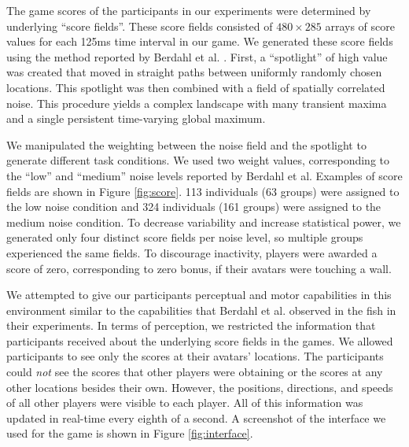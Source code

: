 \documentclass[12pt,letterpaper]{article}
\begin{document}
The game scores of the participants in our experiments were determined
by underlying ``score fields''.  These score fields consisted of $480
\times 285$ arrays of score values for each 125ms time interval in our
game.  We generated these score fields using the method reported by
Berdahl et al. \citeyear{berdahl_emergent_2013}. First, a
``spotlight'' of high value was created that moved in straight paths
between uniformly randomly chosen locations.  This spotlight was then
combined with a field of spatially correlated noise.  This procedure
yields a complex landscape with many transient maxima and a single
persistent time-varying global maximum.

We manipulated the weighting between the noise field and the spotlight
to generate different task conditions.  We used two weight values,
corresponding to the ``low'' and ``medium'' noise levels reported by
Berdahl et al.  Examples of score fields are shown in Figure
\ref{fig:score}.  113 individuals (63 groups) were assigned to the low
noise condition and 324 individuals (161 groups) were assigned to the
medium noise condition.  To decrease variability and increase
statistical power, we generated only four distinct score fields per
noise level, so multiple groups experienced the same fields.  To
discourage inactivity, players were awarded a score of zero,
corresponding to zero bonus, if their avatars were touching a wall.

We attempted to give our participants perceptual and motor capabilities
in this environment similar to the capabilities that Berdahl et
al. observed in the fish in their experiments.  In terms of
perception, we restricted the information that participants received
about the underlying score fields in the games.  We allowed
participants to see only the scores at their avatars' locations.  The
participants could \emph{not} see the scores that other players were
obtaining or the scores at any other locations besides their own.
However, the positions, directions, and speeds of all other players
were visible to each player.  All of this information was updated in
real-time every eighth of a second.  A screenshot of the interface we
used for the game is shown in Figure \ref{fig:interface}.
\end{document}
